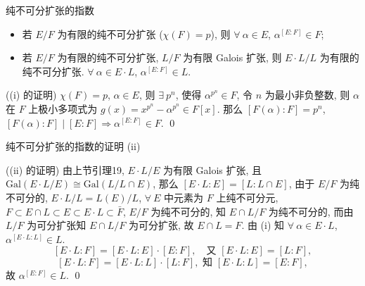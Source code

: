\begin{frame}{纯不可分扩张的指数}

\begin{lem}[纯不可分扩张的指数]
\begin{itemize}
\item[(i)] 若 $E/F$ 为有限的纯不可分扩张 ($\chi(F) = p$), 则 $\forall\ \alpha \in E$,
  $\alpha^{[E:F]} \in F$;
\item[(ii)] 若 $E/F$ 为有限的纯不可分扩张, $L/F$ 为有限 Galois 扩张, 则
  $E \cdot L/L$ 为有限的纯不可分扩张. $\forall\ \alpha \in E \cdot L$,
  $\alpha^{[E:F]} \in L$.
\end{itemize}
\end{lem}


\startproof[bg=yellow, fg=red]((i) 的证明)
$\chi(F) = p$, $\alpha \in E$, 则 $\exists\ p^n$, 使得 $\alpha^{p^n} \in F$,
令 $n$ 为最小非负整数,
则 $\alpha$ 在 $F$ 上极小多项式为 $g(x) = x^{p^n} - \alpha^{p^n} \in F[x]$.
那么 $[F(\alpha):F] = p^n$, $[F(\alpha):F] \mid [E:F] \Longrightarrow
\alpha^{[E:F]} \in F$.
\qed

\end{frame}


\begin{frame}{纯不可分扩张的指数的证明 (ii)}

\startproof[bg=yellow, fg=red]((ii) 的证明)
由上节引理19, $E \cdot L/E$ 为有限 Galois 扩张, 且
$\mathrm{Gal}(E \cdot L/E) \cong \mathrm{Gal}(L/L \cap E)$,
那么 $[E \cdot L:E] = [L:L \cap E]$, 由于 $E/F$ 为纯不可分的,
$E \cdot L/L = L(E)/L$,
$\forall\ E$ 中元素为 $F$ 上纯不可分元,
$F \subset E \cap L \subset E \subset E \cdot L \subset \bar{F}$,
$E/F$ 为纯不可分的, 知 $E \cap L/F$ 为纯不可分的,
而由 $L/F$ 为可分扩张知 $E \cap L/F$ 为可分扩张, 故 $E \cap L = F$.
由 (i) 知 $\forall\ \alpha \in E \cdot L$, $\alpha^{[E \cdot L:L]} \in L$.
\[
[E \cdot L:F] = [E \cdot L:E] \cdot [E:F],
\quad \text{又 } [E \cdot L:E] = [L:F],
\]
\[
[E \cdot L:F] = [E \cdot L:L] \cdot [L:F], \text{ 知 } [E \cdot L:L] = [E:F],
\]
故 $\alpha^{[E:F]} \in L$.
\qed

\end{frame}


